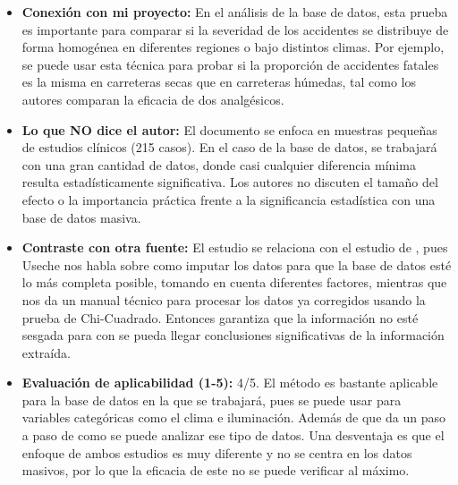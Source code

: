 \documentclass[12pt]{article}
\begin{document}
\begin{itemize}
    \item \textbf{Conexión con mi proyecto:} En el análisis de la base de datos, esta
    prueba es importante para comparar si la severidad de los accidentes se distribuye 
    de forma homogénea en diferentes regiones o bajo distintos climas. Por ejemplo, 
    se puede usar esta técnica para probar si la proporción de accidentes fatales es 
    la misma en carreteras secas que en carreteras húmedas, tal como los autores 
    comparan la eficacia de dos analgésicos.    
	\item \textbf{Lo que NO dice el autor:} El documento se enfoca en muestras 
	pequeñas de estudios clínicos (215 casos). En el caso de la base de datos, 
	se trabajará con una gran cantidad de datos, donde casi cualquier diferencia 
	mínima resulta estadísticamente significativa. Los autores no discuten el tamaño 
	del efecto o la importancia práctica frente a la significancia estadística con una base de datos masiva.
	\item \textbf{Contraste con otra fuente:} El estudio se relaciona con el
	estudio de \textcite{USECHE2006}, pues Useche nos habla sobre como 
	imputar los datos para que la base de datos esté lo más completa posible, tomando 
	en cuenta diferentes factores, mientras que \textcite{MONTANA2025} nos da un manual 
	técnico para procesar los datos ya corregidos usando la prueba de Chi-Cuadrado. 
	Entonces \textcite{USECHE2006} garantiza que la información no esté sesgada para
	con \textcite{MONTANA2025} se pueda llegar conclusiones significativas de la información extraída.
    
	\item \textbf{Evaluación de aplicabilidad (1-5):} 4/5.  El método es bastante 
	aplicable para la base de datos en la que se trabajará, pues se puede usar para 
	variables categóricas como el clima e iluminación. Además de que da un paso a 
	paso de como se puede analizar ese tipo de datos. Una desventaja es que el enfoque 
	de ambos estudios es muy diferente y no se centra en los datos masivos, por lo que 
	la eficacia de este no se puede verificar al máximo.
    

\end{itemize}
\end{document}
